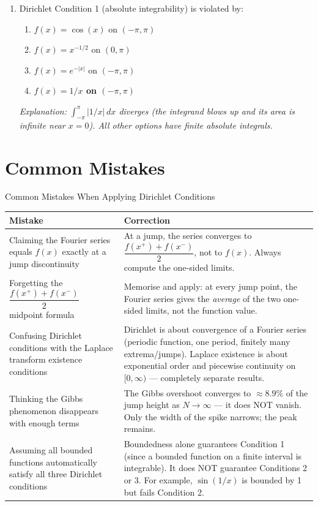 \documentclass[12pt,a4paper]{article}
\begin{document}
\begin{enumerate}[label=\textbf{MCQ \arabic*.}]
\item Dirichlet Condition 1 (absolute integrability) is violated by:
   \begin{enumerate}[label=(\alph*)]
      \item $f(x) = \cos(x)$ on $(-\pi,\pi)$
      \item $f(x) = x^{-1/2}$ on $(0,\pi)$
      \item $f(x) = e^{-|x|}$ on $(-\pi,\pi)$
      \item \textbf{$f(x) = 1/x$ on $(-\pi,\pi)$}
   \end{enumerate}
   \textit{Explanation: $\int_{-\pi}^{\pi}|1/x|\,dx$ diverges (the integrand blows up and its area is infinite near $x=0$). All other options have finite absolute integrals.}

\end{enumerate}

\section{Common Mistakes}

\begin{mistakebox}{Common Mistakes When Applying Dirichlet Conditions}
\begin{tabular}{@{}p{6cm}p{8cm}@{}}
\toprule
\textbf{Mistake} & \textbf{Correction} \\
\midrule
Claiming the Fourier series equals $f(x)$ exactly at a jump discontinuity
  & At a jump, the series converges to $\dfrac{f(x^+)+f(x^-)}{2}$, not to $f(x)$. Always compute the one-sided limits. \\
\midrule
Forgetting the $\dfrac{f(x^+)+f(x^-)}{2}$ midpoint formula
  & Memorise and apply: at every jump point, the Fourier series gives the \emph{average} of the two one-sided limits, not the function value. \\
\midrule
Confusing Dirichlet conditions with the Laplace transform existence conditions
  & Dirichlet is about convergence of a Fourier series (periodic function, one period, finitely many extrema/jumps). Laplace existence is about exponential order and piecewise continuity on $[0,\infty)$ --- completely separate results. \\
\midrule
Thinking the Gibbs phenomenon disappears with enough terms
  & The Gibbs overshoot converges to $\approx 8.9\%$ of the jump height as $N\to\infty$ --- it does NOT vanish. Only the width of the spike narrows; the peak remains. \\
\midrule
Assuming all bounded functions automatically satisfy all three Dirichlet conditions
  & Boundedness alone guarantees Condition 1 (since a bounded function on a finite interval is integrable). It does NOT guarantee Conditions 2 or 3. For example, $\sin(1/x)$ is bounded by 1 but fails Condition 2. \\
\bottomrule
\end{tabular}
\end{mistakebox}
\end{document}

